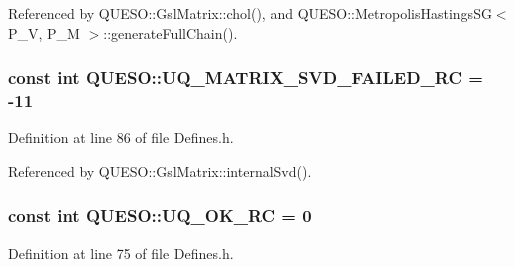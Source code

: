 Referenced by Q\-U\-E\-S\-O\-::\-Gsl\-Matrix\-::chol(), and Q\-U\-E\-S\-O\-::\-Metropolis\-Hastings\-S\-G$<$ P\-\_\-\-V, P\-\_\-\-M $>$\-::generate\-Full\-Chain().

\hypertarget{namespace_q_u_e_s_o_a7502f36b36f6ba457d2cf5004f7a7c69}{
\subsubsection[{U\-Q\-\_\-\-M\-A\-T\-R\-I\-X\-\_\-\-S\-V\-D\-\_\-\-F\-A\-I\-L\-E\-D\-\_\-\-R\-C}]{\setlength{\rightskip}{0pt plus 5cm}const int Q\-U\-E\-S\-O\-::\-U\-Q\-\_\-\-M\-A\-T\-R\-I\-X\-\_\-\-S\-V\-D\-\_\-\-F\-A\-I\-L\-E\-D\-\_\-\-R\-C = -\/11}}\label{namespace_q_u_e_s_o_a7502f36b36f6ba457d2cf5004f7a7c69}


Definition at line 86 of file Defines.\-h.



Referenced by Q\-U\-E\-S\-O\-::\-Gsl\-Matrix\-::internal\-Svd().

\hypertarget{namespace_q_u_e_s_o_a8e909502900aecf24cedba022ea84471}{
\subsubsection[{U\-Q\-\_\-\-O\-K\-\_\-\-R\-C}]{\setlength{\rightskip}{0pt plus 5cm}const int Q\-U\-E\-S\-O\-::\-U\-Q\-\_\-\-O\-K\-\_\-\-R\-C = 0}}\label{namespace_q_u_e_s_o_a8e909502900aecf24cedba022ea84471}


Definition at line 75 of file Defines.\-h.



